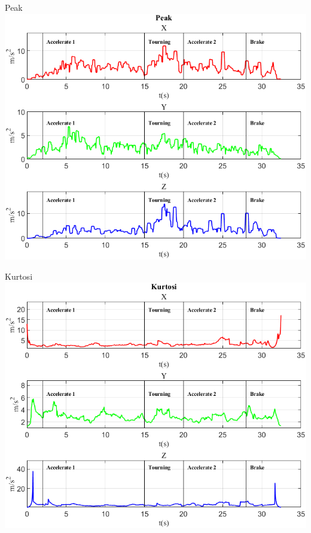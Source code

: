 \documentclass[beamer]{standalone}
\begin{document}

	\begin{frame}{{Peak}}
		\centering\includegraphics[height=.8\textheight]{figure/Acc/Peak}
	\end{frame}
	
	\begin{frame}{{Kurtosi}}
		\centering\includegraphics[height=.8\textheight]{figure/Acc/Kurtosi}
	\end{frame}
	
\end{document}
